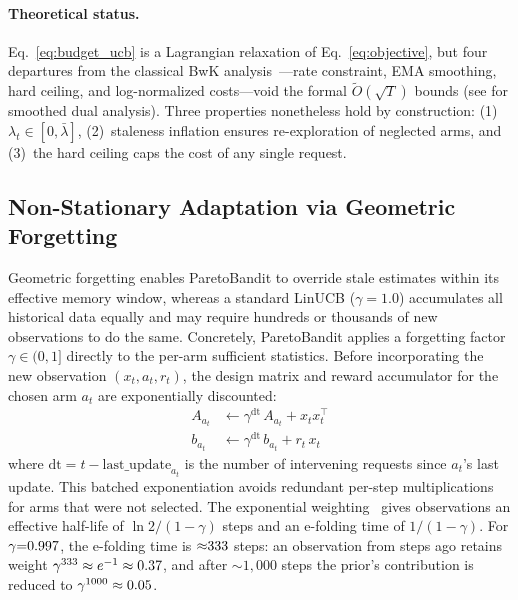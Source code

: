 \paragraph{Theoretical status.}
Eq.~\ref{eq:budget_ucb} is a Lagrangian relaxation of Eq.~\ref{eq:objective}, but four departures from the classical BwK analysis~\cite{badanidiyuru2013bwk}---rate constraint, EMA smoothing, hard ceiling, and log-normalized costs---void the formal $\tilde{O}(\sqrt{T})$ bounds (see \citealt{balseiro2019learning} for smoothed dual analysis). Three properties nonetheless hold by construction: (1)~$\lambda_t \in [0, \bar\lambda]$, (2)~staleness inflation ensures re-exploration of neglected arms, and (3)~the hard ceiling caps the cost of any single request.

\subsection{Non-Stationary Adaptation via Geometric Forgetting}
\label{sec:adaptive_learning}

Geometric forgetting enables ParetoBandit to override stale estimates within its effective memory window, whereas a standard LinUCB ($\gamma{=}1.0$) accumulates all historical data equally and may require hundreds or thousands of new observations to do the same. Concretely, ParetoBandit applies a forgetting factor $\gamma \in (0, 1]$ directly to the per-arm sufficient statistics. Before incorporating the new observation $(x_t, a_t, r_t)$, the design matrix and reward accumulator for the chosen arm $a_t$ are exponentially discounted:
\begin{align}
    A_{a_t} &\leftarrow \gamma^{\mathrm{dt}} \, A_{a_t} + x_t x_t^\top
    \label{eq:forget_A} \\
    b_{a_t} &\leftarrow \gamma^{\mathrm{dt}} \, b_{a_t} + r_t \, x_t
    \label{eq:forget_b}
\end{align}
where $\mathrm{dt} = t - \text{last\_update}_{a_t}$ is the number of intervening requests since $a_t$'s last update. This batched exponentiation avoids redundant per-step multiplications for arms that were not selected. The exponential weighting~\cite{garivier2011switching} gives observations an effective half-life of $\ln 2 / (1 - \gamma)$ steps and an e-folding time of $1 / (1 - \gamma)$. For $\gamma{=}0.997$, the e-folding time is ${\approx}333$ steps: an observation from \ppEffMemSteps{} steps ago retains weight $\gamma^{333} \approx e^{-1} \approx 0.37$, and after ${\sim}1{,}000$ steps the prior's contribution is reduced to $\gamma^{1000} \approx 0.05$.

